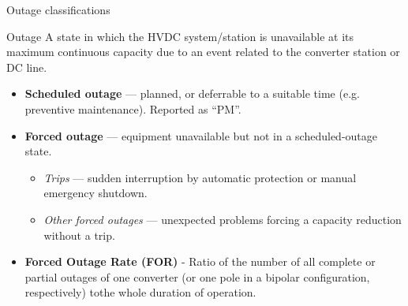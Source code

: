 



\begin{frame}{Outage classifications}
  \begin{block}{Outage}
    A state in which the HVDC system/station is unavailable at its maximum
    continuous capacity due to an event related to the converter station
    or DC line.
  \end{block}
  \vspace{0.3em}
  \begin{itemize}
    \setlength{\itemsep}{0.5em}
    \item \textbf{Scheduled outage} — planned, or deferrable to a suitable
          time (e.g. preventive maintenance). Reported as ``PM''.
    \item \textbf{Forced outage} — equipment unavailable but not in a scheduled-outage state.
      \begin{itemize}
        \item \emph{Trips} — sudden interruption by automatic protection or manual emergency shutdown.
        \item \emph{Other forced outages} — unexpected problems forcing a capacity reduction without a trip.
      \end{itemize}
    \item \textbf{Forced Outage Rate (FOR)} - Ratio of the number of all complete or partial outages of one converter 
    (or one pole in a bipolar configuration, respectively) tothe whole duration of operation.
  \end{itemize}
\end{frame}

